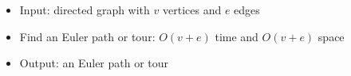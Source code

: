 \begin{itemize}
	\item Input: directed graph with $v$ vertices and $e$ edges
	\item Find an Euler path or tour: $O(v+e)$ time and $O(v+e)$ space
	\item Output: an Euler path or tour
\end{itemize}
